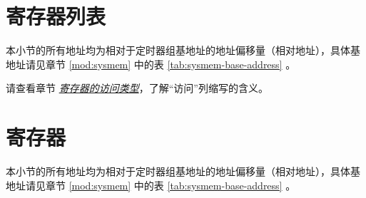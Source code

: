 \documentclass[main\_\_CN.tex]{subfiles}
\begin{document}


\newpage
\hypertarget{timg-reg-summ}{}
\section{寄存器列表}
\label{sec:timg-reg-summ}

本小节的所有地址均为相对于定时器组基地址的地址偏移量（相对地址），具体基地址请见章节 \ref{mod:sysmem} \textit{} 中的表 \ref{tab:sysmem-base-address} \textit{}。

请查看章节 \hyperref[glossary-access-types]{\textit{寄存器的访问类型}}，了解“访问”列缩写的含义。






\newpage
\section{寄存器}

本小节的所有地址均为相对于定时器组基地址的地址偏移量（相对地址），具体基地址请见章节 \ref{mod:sysmem} \textit{} 中的表 \ref{tab:sysmem-base-address} \textit{}。



\end{document}
